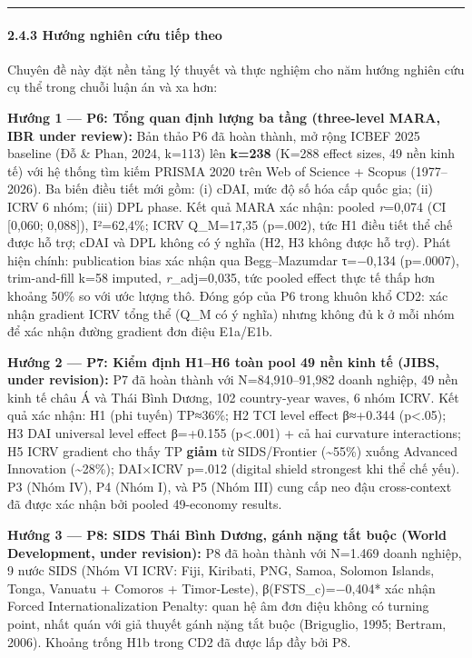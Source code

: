 \documentclass[12pt,a4paper]{article}
\begin{document}
\begin{center}\rule{0.5\linewidth}{0.5pt}\end{center}

\hypertarget{243-hux1b0ux1edbng-nghiuxean-cux1ee9u-tiux1ebfp-theo}{%
\paragraph{2.4.3 Hướng nghiên cứu tiếp
theo}\label{243-hux1b0ux1edbng-nghiuxean-cux1ee9u-tiux1ebfp-theo}}

Chuyên đề này đặt nền tảng lý thuyết và thực nghiệm cho năm hướng nghiên
cứu cụ thể trong chuỗi luận án và xa hơn:

\textbf{Hướng 1 --- P6: Tổng quan định lượng ba tầng (three-level MARA,
IBR under review):} Bản thảo P6 đã hoàn thành, mở rộng ICBEF 2025
baseline (Đỗ \& Phan, 2024, k=113) lên \textbf{k=238} (K=288 effect
sizes, 49 nền kinh tế) với hệ thống tìm kiếm PRISMA 2020 trên Web of
Science + Scopus (1977--2026). Ba biến điều tiết mới gồm: (i) cDAI, mức
độ số hóa cấp quốc gia; (ii) ICRV 6 nhóm; (iii) DPL phase. Kết quả MARA
xác nhận: pooled \emph{r}=0,074 (CI {[}0,060; 0,088{]}), I²=62,4\%; ICRV
Q\_M=17,35 (p=.002), tức H1 điều tiết thể chế được hỗ trợ; cDAI và DPL
không có ý nghĩa (H2, H3 không được hỗ trợ). Phát hiện chính:
publication bias xác nhận qua Begg--Mazumdar τ=−0,134 (p=.0007),
trim-and-fill k=58 imputed, \emph{r}\_adj=0,035, tức pooled effect thực
tế thấp hơn khoảng 50\% so với ước lượng thô. Đóng góp của P6 trong
khuôn khổ CD2: xác nhận gradient ICRV tổng thể (Q\_M có ý nghĩa) nhưng
không đủ k ở mỗi nhóm để xác nhận đường gradient đơn điệu E1a/E1b.

\textbf{Hướng 2 --- P7: Kiểm định H1--H6 toàn pool 49 nền kinh tế (JIBS,
under revision):} P7 đã hoàn thành với N=84,910--91,982 doanh nghiệp, 49
nền kinh tế châu Á và Thái Bình Dương, 102 country-year waves, 6 nhóm
ICRV. Kết quả xác nhận: H1 (phi tuyến) TP≈36\%; H2 TCI level effect
β≈+0.344 (p\textless.05); H3 DAI universal level effect β=+0.155
(p\textless.001) + cả hai curvature interactions; H5 ICRV gradient cho
thấy TP \textbf{giảm} từ SIDS/Frontier (\textasciitilde55\%) xuống
Advanced Innovation (\textasciitilde28\%); DAI×ICRV p=.012 (digital
shield strongest khi thể chế yếu). P3 (Nhóm IV), P4 (Nhóm I), và P5
(Nhóm III) cung cấp neo đậu cross-context đã được xác nhận bởi pooled
49-economy results.

\textbf{Hướng 3 --- P8: SIDS Thái Bình Dương, gánh nặng tắt buộc (World
Development, under revision):} P8 đã hoàn thành với N=1.469 doanh
nghiệp, 9 nước SIDS (Nhóm VI ICRV: Fiji, Kiribati, PNG, Samoa, Solomon
Islands, Tonga, Vanuatu + Comoros + Timor-Leste), β(FSTS\_c)=−0,404* xác
nhận Forced Internationalization Penalty: quan hệ âm đơn điệu không có
turning point, nhất quán với giả thuyết gánh nặng tắt buộc (Briguglio,
1995; Bertram, 2006). Khoảng trống H1b trong CD2 đã được lấp đầy bởi P8.
\end{document}
